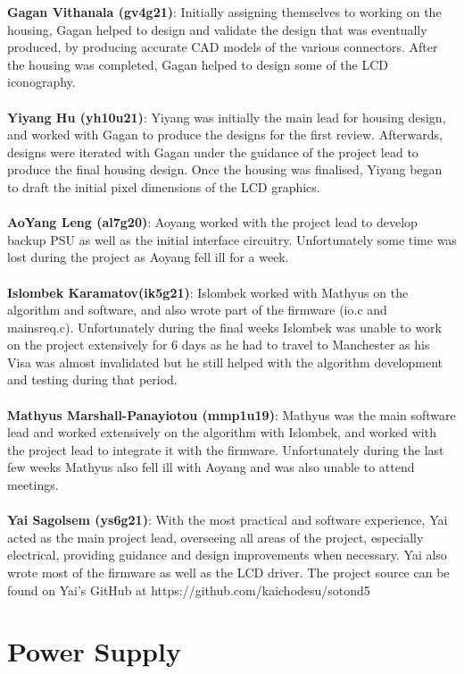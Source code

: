 \documentclass[9pt, technote, a4paper, nofonttune]{IEEEphot}
\begin{document}
\textbf{Gagan Vithanala (gv4g21)}:  Initially assigning themselves to working on the housing, Gagan helped to design and validate the design that was eventually produced, by producing accurate CAD models of the various connectors.  After the housing was completed, Gagan helped to design some of the LCD iconography.
\\
\\
\textbf{Yiyang Hu (yh10u21)}:  Yiyang was initially the main lead for housing design, and worked with Gagan to produce the designs for the first review.  Afterwards, designs were iterated with Gagan under the guidance of the project lead to produce the final housing design.  Once the housing was finalised, Yiyang began to draft the initial pixel dimensions of the LCD graphics.
\\
\\
\textbf{AoYang Leng (al7g20)}:  Aoyang worked with the project lead to develop backup PSU as well as the initial interface circuitry.  Unfortunately some time was lost during the project as Aoyang fell ill for a week.
\\
\\
\textbf{Islombek Karamatov(ik5g21)}:  Islombek worked with Mathyus on the algorithm and software, and also wrote part of the firmware (io.c and mainsreq.c).  Unfortunately during the final weeks Islombek was unable to work on the project extensively for 6 days as he had to travel to Manchester as his Visa was almost invalidated but he still helped with the algorithm development and testing during that period.
\\
\\
\textbf{Mathyus Marshall-Panayiotou (mmp1u19)}:  Mathyus was the main software lead and worked extensively on the algorithm with Islombek, and worked with the project lead to integrate it with the firmware.  Unfortunately during the last few weeks Mathyus also fell ill with Aoyang and was also unable to attend meetings.
\\
\\
\textbf{Yai Sagolsem (ys6g21)}:  With the most practical and software experience, Yai acted as the main project lead, overseeing all areas of the project, especially electrical, providing guidance and design improvements when necessary.  Yai also wrote most of the firmware as well as the LCD driver.  The project source can be found on Yai's GitHub at https://github.com/kaichodesu/sotond5


\newpage
\section{Power Supply}
\end{document}
